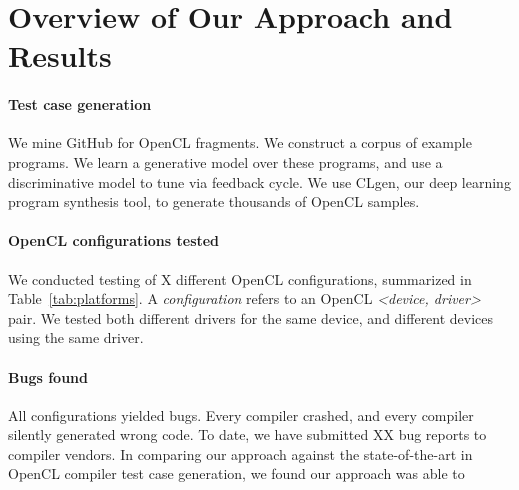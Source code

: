 \section{Overview of Our Approach and Results}\label{sec:overview}

\paragraph{Test case generation} We mine GitHub for OpenCL fragments. We construct a corpus of example programs. We learn a generative model over these programs, and use a discriminative model to tune via feedback cycle. We use CLgen, our deep learning program synthesis tool, to generate thousands of OpenCL samples.

\paragraph{OpenCL configurations tested} We conducted testing of X different OpenCL configurations, summarized in Table~\ref{tab:platforms}. A \emph{configuration} refers to an OpenCL \emph{<device, driver>} pair. We tested both different drivers for the same device, and different devices using the same driver.



\paragraph{Bugs found} All configurations yielded bugs. Every compiler crashed, and every compiler silently generated wrong code. To date, we have submitted XX bug reports to compiler vendors. In comparing our approach against the state-of-the-art in OpenCL compiler test case generation, we found our approach was able to \cc{\ldots} 